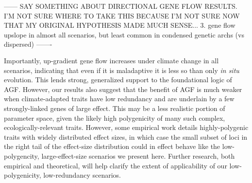 \documentclass[9pt,twocolumn,twoside,lineno]{pnas-new}
\begin{document}
------
SAY SOMETHING ABOUT DIRECTIONAL GENE FLOW RESULTS. I'M NOT SURE WHERE TO TAKE THIS BECAUSE
I'M NOT SURE NOW THAT MY ORIGINAL HYPOTHESIS MADE MUCH SENSE...
 3. gene flow upslope in almost all scenarios, but least common in condensed genetic archs (vs dispersed)
-------


Importantly, up-gradient gene flow increases under climate change in all scenarios,
indicating that even if it is maladaptive it is less so than only \textit{in situ} evolution.
This lends strong, generalized support to the foundational logic of AGF.
However, our results also suggest that the benefit of AGF is much weaker
when climate-adapted traits have low redundancy and are underlain by a few strongly-linked genes of large effect.
This may be a less realistic portion of parameter space, given the likely high polygenicity
of many such complex, ecologically-relevant traits. However, some empirical work
details highly-polygenic traits with widely distributed effect sizes, in which case the small
subset of loci in the right tail of the effect-size distribution could in effect
behave like the low-polygencity, large-effect-size scenarios we present here.
Further research, both empirical and theoretical, will help clarify the extent
of applicability of our low-polygenicity, low-redundancy scenarios.
\end{document}
